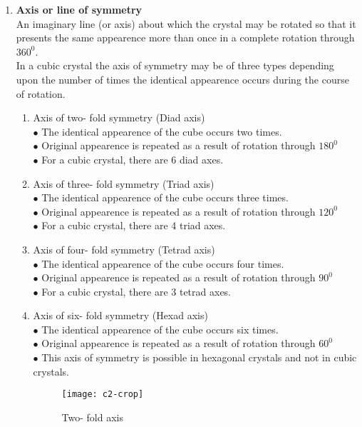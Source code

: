 \begin{enumerate}
	\item \textbf{Axis or line of symmetry}\\
	An imaginary line (or axis) about which the crystal may be rotated so that it presents the same appearence more than once in a complete rotation through $360^{0}$.\\
	In a cubic crystal the axis of symmetry may be of three types depending upon the number of times the identical appearence occurs during the course of rotation.
	\begin{enumerate}[label=\alph*., itemsep=\baselineskip]
		\item Axis of two- fold symmetry (Diad axis)\\
		$\bullet$	The identical appearence of the cube occurs two times.\\
		$\bullet$	Original appearence is repeated as a result of rotation through $180^{0}$\\
		$\bullet$	For a cubic crystal, there are 6 diad axes.
		\item Axis of three- fold symmetry (Triad axis)\\
		$\bullet$ The identical appearence of the cube occurs three times.\\
		$\bullet$ Original appearence is repeated as a result of rotation through $120^{0}$\\
		$\bullet$ For a cubic crystal, there are 4 triad axes.
		\item Axis of four- fold symmetry (Tetrad axis)\\
		$\bullet$ The identical appearence of the cube occurs four times.\\
		$\bullet$ Original appearence is repeated as a result of rotation through $90^{0}$\\
		$\bullet$ For a cubic crystal, there are 3 tetrad axes.	
		\item Axis of six- fold symmetry (Hexad axis)\\
		$\bullet$ The identical appearence of the cube occurs six times.\\
		$\bullet$ Original appearence is repeated as a result of rotation through $60^{0}$\\
		$\bullet$ This axis of symmetry is possible in hexagonal crystals and not in cubic crystals.
		\begin{figure}[h]	
			\begin{minipage}{0.24\textwidth} 
				\texttt{[image: c2-crop]}
				\caption*{Two- fold axis}
			\end{minipage}

\end{figure}
\end{enumerate}
\end{enumerate}
